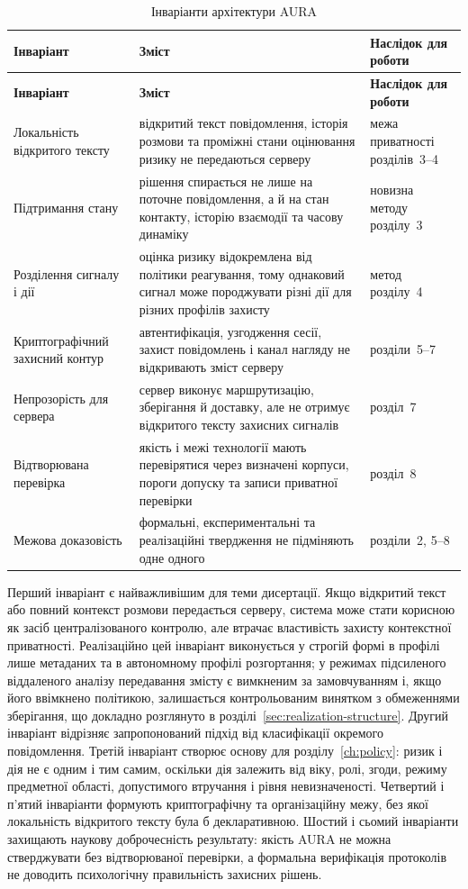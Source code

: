 \begin{longtable}{p{4.2cm} p{7.1cm} p{2.3cm}}
\caption{Інваріанти архітектури AURA}
\label{tab:architecture-invariants}\\
\toprule
\textbf{Інваріант} & \textbf{Зміст} & \textbf{Наслідок для роботи} \\
\midrule
\endfirsthead
\toprule
\textbf{Інваріант} & \textbf{Зміст} & \textbf{Наслідок для роботи} \\
\midrule
\endhead
Локальність відкритого тексту & відкритий текст повідомлення, історія розмови та проміжні стани оцінювання ризику не передаються серверу & межа приватності розділів~3--4 \\
Підтримання стану & рішення спирається не лише на поточне повідомлення, а й на стан контакту, історію взаємодії та часову динаміку & новизна методу розділу~3 \\
Розділення сигналу і дії & оцінка ризику відокремлена від політики реагування, тому однаковий сигнал може породжувати різні дії для різних профілів захисту & метод розділу~4 \\
Криптографічний захисний контур & автентифікація, узгодження сесії, захист повідомлень і канал нагляду не відкривають зміст серверу & розділи~5--7 \\
Непрозорість для сервера & сервер виконує маршрутизацію, зберігання й доставку, але не отримує відкритого тексту захисних сигналів & розділ~7 \\
Відтворювана перевірка & якість і межі технології мають перевірятися через визначені корпуси, пороги допуску та записи приватної перевірки & розділ~8 \\
Межова доказовість & формальні, експериментальні та реалізаційні твердження не підміняють одне одного & розділи~2, 5--8 \\
\bottomrule
\end{longtable}

Перший інваріант є найважливішим для теми дисертації. Якщо відкритий текст або повний контекст розмови передається серверу, система може стати корисною як засіб централізованого контролю, але втрачає властивість захисту контекстної приватності. Реалізаційно цей інваріант виконується у строгій формі в профілі лише метаданих та в автономному профілі розгортання; у режимах підсиленого віддаленого аналізу передавання змісту є вимкненим за замовчуванням і, якщо його ввімкнено політикою, залишається контрольованим винятком з обмеженнями зберігання, що докладно розглянуто в розділі~\ref{sec:realization-structure}. Другий інваріант відрізняє запропонований підхід від класифікації окремого повідомлення. Третій інваріант створює основу для розділу~\ref{ch:policy}: ризик і дія не є одним і тим самим, оскільки дія залежить від віку, ролі, згоди, режиму предметної області, допустимого втручання і рівня невизначеності. Четвертий і п'ятий інваріанти формують криптографічну та організаційну межу, без якої локальність відкритого тексту була б декларативною. Шостий і сьомий інваріанти захищають наукову доброчесність результату: якість AURA не можна стверджувати без відтворюваної перевірки, а формальна верифікація протоколів не доводить психологічну правильність захисних рішень.

